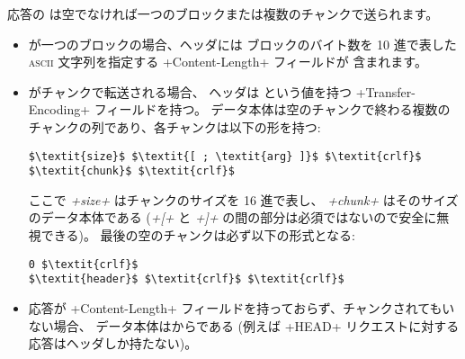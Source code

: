 応答の \textit{} は空でなければ一つのブロックまたは複数のチャンクで送られます。

\begin{itemize}
\item \textit{} が一つのブロックの場合、ヘッダには
  ブロックのバイト数を 10 進で表した \textsc{ascii} 文字列を指定する \ml+Content-Length+ フィールドが
  含まれます。

\item \textit{} がチャンクで転送される場合、
  ヘッダは  という値を持つ \ml+Transfer-Encoding+ フィールドを持つ。
  データ本体は空のチャンクで終わる複数のチャンクの列であり、各チャンクは以下の形を持つ:
%
\begin{lstlisting}
$\textit{size}$ $\textit{[ ; \textit{arg} ]}$ $\textit{crlf}$
$\textit{chunk}$ $\textit{crlf}$
\end{lstlisting}
%
ここで \textit{\ml+size+} はチャンクのサイズを 16 進で表し、
\textit{\ml+chunk+} はそのサイズのデータ本体である (\textit{\ml+[+} と \textit{\ml+]+}
の間の部分は必須ではないので安全に無視できる)。
最後の空のチャンクは必ず以下の形式となる:
%
\begin{lstlisting}
0 $\textit{crlf}$
$\textit{header}$ $\textit{crlf}$ $\textit{crlf}$
\end{lstlisting}
%
\item 応答が \ml+Content-Length+ フィールドを持っておらず、チャンクされてもいない場合、
  データ本体はからである (例えば \ml+HEAD+ リクエストに対する応答はヘッダしか持たない)。
\end{itemize}
